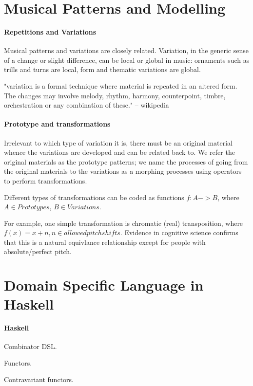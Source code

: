 \documentclass[acmsmall,review,anonymous]{acmart}\settopmatter{printfolios=true,printccs=false,printacmref=false}
\begin{document}
\section{Musical Patterns and Modelling}

\paragraph{Repetitions and Variations}
Musical patterns and variations are closely related.
Variation, in the generic sense of a change or slight difference, can be local
or global in music: ornaments such as trills and turns are local, form and
thematic variations are global. 

"variation is a formal technique where material is repeated in an altered form.
The changes may involve melody, rhythm, harmony, counterpoint, timbre,
orchestration or any combination of these."
-- wikipedia

\paragraph{Prototype and transformations}
Irrelevant to which type of variation it is, there must be an original material
whence the variations are developed and can be related back to.
We refer the original materials as the prototype patterns; we name the processes
of going from the original materials to the variations as a morphing processes
using operators to perform transformations.

Different types of transformations can be coded as functions $f: A -> B$, where
$A \in {Prototypes}$, $B \in {Variations}$.


For example, one simple transformation is
chromatic (real) transposition, where $f(x) = x + n, n \in {allowed pitch shifts}$.
Evidence in cognitive science confirms that this is a natural equivlance
relationship except for people with absolute/perfect pitch.

\section{Domain Specific Language in Haskell}

\paragraph{Haskell}
Combinator DSL.

Functors.

Contravariant functors.
\end{document}
